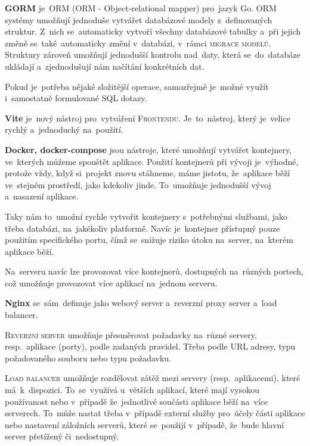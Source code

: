 \documentclass[14pt,a4paper]{article}
\begin{document}
            \textbf{GORM} je~ORM (ORM - Object-relational mapper) pro~jazyk Go. \textsc{ORM} systémy umožňují jednoduše vytvářet databázové modely z~definovaných struktur. 
            Z~nich se~automaticky vytvoří všechny databázové tabulky a~při jejich změně se~také~automaticky změní v~databázi, v~rámci \textsc{migrace modelů}.
            Struktury zároveň umožňují jednodušší kontrolu nad~daty, která se~do~databáze ukládají a~zjednodušují nám načítání konkrétních dat. \parencite{freecodecamp:orm}

            Pokud je~potřeba nějaké složitější operace, samozřejmě je~možné využít i~samostatně formulované SQL dotazy. \parencite{gormGORM}

            \textbf{Vite} je~nový nástroj pro~vytváření \textsc{Frontendu}. Je~to~nástroj, který je~velice rychlý a~jednoduchý na~použití.

            \textbf{Docker, docker-compose} jsou nástroje, které umožňují vytvářet kontejnery, ve~kterých můžeme spouštět aplikace.
            Použití kontejnerů při vývoji je~výhodné, protože vždy, když si~projekt znovu stáhneme, máme jistotu, že~aplikace běží
            ve~stejném prostředí, jako kdekoliv jinde. To~umožňuje jednodušší vývoj a~nasazení aplikace.

            Taky nám to~umožní rychle vytvořit kontejnery s~potřebnými službami, jako třeba databázi, na~jakékoliv platformě. Navíc je~kontejner přístupný pouze použitím specifického portu,
            čímž se~snižuje riziko útoku na~server, na~kterém aplikace běží. \parencite{docker}

            Na~serveru navíc lze provozovat více kontejnerů, dostupných na~různých portech, což umožňuje provozovat více aplikací na~jednom serveru.

            \textbf{Nginx} se~sám~definuje jako webový server a~reverzní proxy server a~load balancer.

            \textsc{Reverzní server} umožňuje přesměrovat požadavky na~různé servery, resp.~aplikace (porty), podle zadaných pravidel. Třeba podle URL adresy, typu požadovaného souboru nebo typu požadavku.
            
            \textsc{Load balancer} umožňuje rozdělovat zátěž mezi servery (resp.~aplikacemi), které má~k~dispozici. To~se~využívá u~větších aplikací, které mají vysokou používanost nebo v~případě že~jednotlivé součásti aplikace běží na~více serverech. To~může nastat třeba v~případě externí služby pro~účely části aplikace nebo nastavení záložních serverů, které se~použijí v~případě, že~bude hlavní server přetížený či~nedostupný.
            
\end{document}

